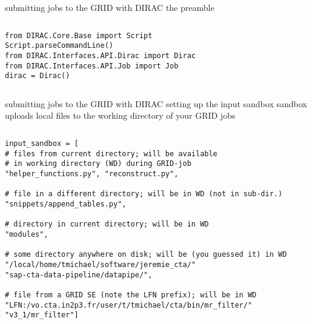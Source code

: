 \documentclass{beamer}
\begin{document}
\begin{frame}[fragile]{submitting jobs to the GRID with DIRAC}
             {the preamble}
\begin{columns}
\begin{lstlisting}
from DIRAC.Core.Base import Script
Script.parseCommandLine()
from DIRAC.Interfaces.API.Dirac import Dirac
from DIRAC.Interfaces.API.Job import Job
dirac = Dirac()
\end{lstlisting}
\end{columns}
\end{frame}


\begin{frame}[fragile]{submitting jobs to the GRID with DIRAC}
             {setting up the input sandbox}
    sandbox uploads local files to the working directory of your GRID jobs
    \begin{columns}
        \begin{lstlisting}[basicstyle=\scriptsize,firstnumber=6]
input_sandbox = [
# files from current directory; will be available
# in working directory (WD) during GRID-job
"helper_functions.py", "reconstruct.py",

# file in a different directory; will be in WD (not in sub-dir.)
"snippets/append_tables.py",

# directory in current directory; will be in WD
"modules",

# some directory anywhere on disk; will be (you guessed it) in WD
"/local/home/tmichael/software/jeremie_cta/"
"sap-cta-data-pipeline/datapipe/",

# file from a GRID SE (note the LFN prefix); will be in WD
"LFN:/vo.cta.in2p3.fr/user/t/tmichael/cta/bin/mr_filter/"
"v3_1/mr_filter"]
        \end{lstlisting}
    \end{columns}
\end{frame}
\end{document}
